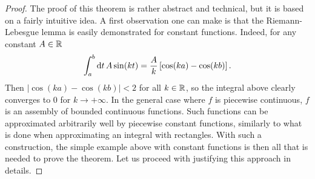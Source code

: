 \begin{proof}
  The proof of this theorem is rather abstract and technical, but it is based on a fairly
  intuitive idea. A first observation one can make is that the Riemann-Lebesgue lemma is
  easily demonstrated for constant functions. Indeed, for any constant $A\in\mathbb{R}$
  \begin{equation}
    \int_a^b\mathrm{d} t\,A\sin(kt)=\frac{A}{k}\,[\cos(ka)-\cos(kb)]\,.
    \label{eq:rl-const}
  \end{equation}
  Then $|\cos(ka)-\cos(kb)|<2$ for all $k\in\mathbb{R}$, so the integral above clearly
  converges to $0$ for $k\to+\infty$. In the general case where $f$ is piecewise
  continuous, $f$ is an assembly of bounded continuous functions. Such functions can be
  approximated arbitrarily well by piecewise constant functions, similarly to what is done
  when approximating an integral with rectangles. With such a construction, the simple
  example above with constant functions is then all that is needed to prove the theorem.
  Let us proceed with justifying this approach in details.


\end{proof}
